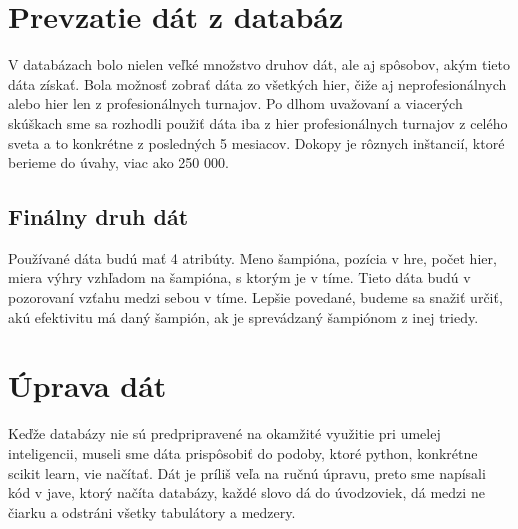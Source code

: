 \section{Prevzatie dát z databáz}
V databázach bolo nielen veľké množstvo druhov dát, ale aj spôsobov, akým tieto dáta získať. Bola možnosť zobrať dáta zo všetkých hier, čiže aj neprofesionálnych alebo hier len z profesionálnych turnajov. Po dlhom uvažovaní a viacerých skúškach sme sa rozhodli použiť dáta iba z hier profesionálnych turnajov z celého sveta a to konkrétne z posledných 5 mesiacov. Dokopy je rôznych inštancií, ktoré berieme do úvahy, viac ako 250 000.

\subsection{Finálny druh dát}
Používané dáta budú mať 4 atribúty. Meno šampióna, pozícia v hre, počet hier, miera výhry vzhľadom na šampióna, s ktorým je v tíme. Tieto dáta budú v pozorovaní vzťahu medzi sebou v tíme. Lepšie povedané, budeme sa snažiť určiť, akú efektivitu má daný šampión, ak je sprevádzaný šampiónom z inej triedy. 

\section{Úprava dát}
Keďže databázy nie sú predpripravené na okamžité využitie pri umelej inteligencii, museli sme dáta prispôsobiť do podoby, ktoré python, konkrétne scikit learn, vie načítať. Dát je príliš veľa na ručnú úpravu, preto sme napísali kód v jave, ktorý načíta databázy, každé slovo dá do úvodzoviek, dá medzi ne čiarku a odstráni všetky tabulátory a medzery.

